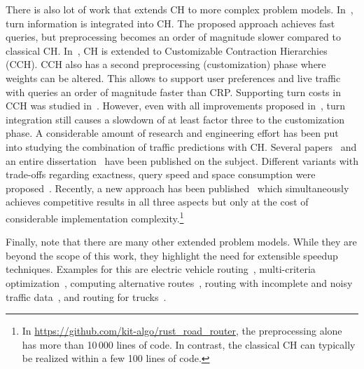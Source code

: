 \documentclass[manuscript,review]{acmart}
\begin{document}
There is also lot of work that extends CH to more complex problem models.
In~\cite{gv-errnt-11}, turn information is integrated into CH.
The proposed approach achieves fast queries, but preprocessing becomes an order of magnitude slower compared to classical CH.
In~\cite{dsw-cch-15}, CH is extended to Customizable Contraction Hierarchies (CCH).
CCH also has a second preprocessing (customization) phase where weights can be altered.
This allows to support user preferences and live traffic with queries an order of magnitude faster than CRP.
Supporting turn costs in CCH was studied in~\cite{bwzz-cchtc-20}.
However, even with all improvements proposed in~\cite{bwzz-cchtc-20}, turn integration still causes a slowdown of at least factor three to the customization phase.
A considerable amount of research and engineering effort has been put into studying the combination of traffic predictions with CH.
Several papers~\cite{bdsv-tdch-09,bgns-tdcha-10,klsv-dtdch-10,bgsv-mtdtt-13} and an entire dissertation~\cite{b-tdrpc-14} have been published on the subject.
Different variants with trade-offs regarding exactness, query speed and space consumption were proposed~\cite{bgsv-mtdtt-13}.
Recently, a new approach has been published~\cite{swz-sfert-21} which simultaneously achieves competitive results in all three aspects but only at the cost of considerable implementation complexity.\footnote{In \url{https://github.com/kit-algo/rust_road_router}, the preprocessing alone has more than 10\,000 lines of code. In contrast, the classical CH can typically be realized within a few 100 lines of code.}

Finally, note that there are many other extended problem models.
While they are beyond the scope of this work, they highlight the need for extensible speedup techniques.
Examples for this are electric vehicle routing~\cite{DBLP:journals/algorithmica/BaumDPSWZ20,DBLP:conf/aaai/EisnerFS11},
multi-criteria optimization~\cite{fns-opca-14,gks-rpfof-10},
computing alternative routes~\cite{bdgs-argrn-11,adgw-arrn-13},
routing with incomplete and noisy traffic data~\cite{dss-tarrn-18},
and routing for trucks~\cite{kswz-erptd-p-20}.

\end{document}
